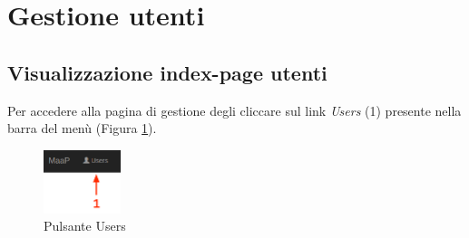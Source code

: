 \clearpage
\section{Gestione utenti}
\label{gestioneutenti}
	


	\subsection{Visualizzazione index-page utenti} %
	\label{visualizzaindexpageutenti}

			\label{pulsanteusers} Per accedere alla pagina di gestione degli  cliccare sul link \emph{Users} (1) presente nella barra del menù (Figura \ref{fig:pulsanteusers}).

				\begin{figure}[H]
					\centering \includegraphics[width=0.2\textwidth]{img/usersButton.png}
					\caption{ \label{fig:pulsanteusers} Pulsante Users}
				\end{figure}





	\clearpage
